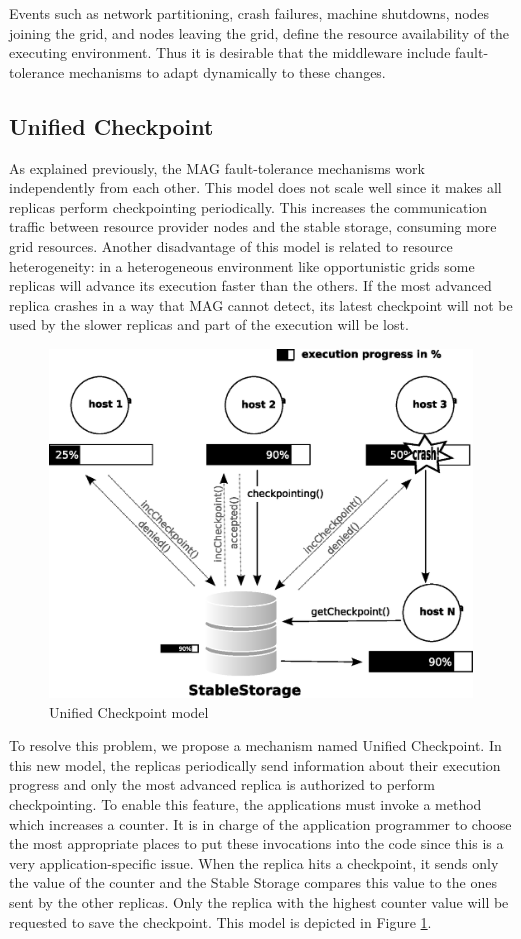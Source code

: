 \documentclass{sig-alternate}
\begin{document}
Events such as network partitioning, crash failures, machine shutdowns,
nodes joining the grid, and nodes leaving the grid, define the resource
availability of the executing environment. Thus it is desirable that the middleware 
include fault-tolerance mechanisms to adapt dynamically to these changes.

\subsection{Unified Checkpoint}

As explained previously, the MAG fault-tolerance mechanisms work
independently from each other. This model does not scale well since it
makes all replicas perform checkpointing periodically. 
This increases the communication traffic between resource provider nodes and
the stable storage, consuming more grid resources. 
Another disadvantage of this model is related to resource
heterogeneity: in a heterogeneous environment like opportunistic grids some
replicas will advance its execution faster than the others. If the most
advanced replica crashes in a way that MAG cannot detect, its latest checkpoint
will not be used by the slower replicas and part of the execution will be
lost. 

\begin{figure}[th]
\centering \includegraphics[width=0.9\columnwidth]{repCheckNovoFalha.eps}
\caption{Unified Checkpoint model}
\label{fig:repCheckNovo}
\end{figure}

To resolve this problem, we propose a mechanism named Unified Checkpoint. In
this new model, the replicas periodically send information about their
execution progress and only the most advanced replica is authorized to perform
checkpointing. To enable this feature, the applications must invoke a method
which increases a counter. It is in charge of the application programmer to
choose the most appropriate places to put these invocations into the code
since this is a very application-specific issue. When the replica hits a
checkpoint, it sends only the value of the counter and the Stable Storage
compares this value to the ones sent by the other replicas. Only the
replica with the highest counter value will be requested to save the
checkpoint. This model is depicted in Figure \ref{fig:repCheckNovo}.
\end{document}
